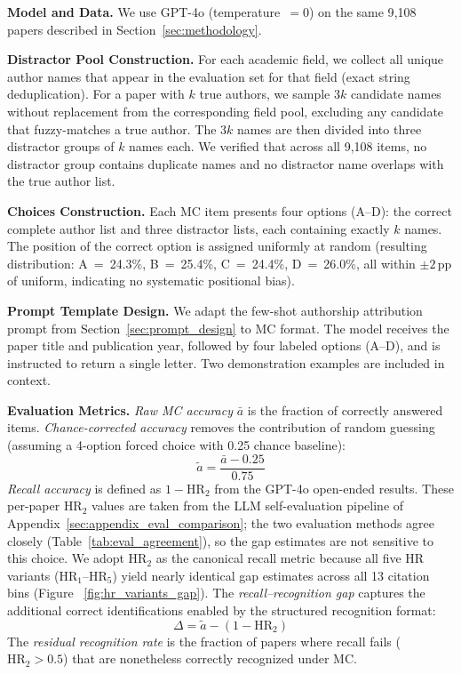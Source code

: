 \documentclass[11pt]{article}
\begin{document}
\noindent\textbf{Model and Data.}
We use GPT-4o (temperature~$= 0$) on the same 9{,}108 papers described in Section~\ref{sec:methodology}.

\noindent\textbf{Distractor Pool Construction.}
For each academic field, we collect all unique author names that appear in the evaluation set for that field (exact string deduplication). For a paper with $k$ true authors, we sample $3k$ candidate names without replacement from the corresponding field pool, excluding any candidate that fuzzy-matches a true author. The $3k$ names are then divided into three distractor groups of $k$ names each. We verified that across all 9{,}108 items, no distractor group contains duplicate names and no distractor name overlaps with the true author list.

\noindent\textbf{Choices Construction.}
Each MC item presents four options (A--D): the correct complete author list and three distractor lists, each containing exactly $k$ names. The position of the correct option is assigned uniformly at random (resulting distribution: A~=~24.3\%, B~=~25.4\%, C~=~24.4\%, D~=~26.0\%, all within $\pm 2$\,pp of uniform, indicating no systematic positional bias).

\noindent\textbf{Prompt Template Design.}
We adapt the few-shot authorship attribution prompt from Section~\ref{sec:prompt_design} to MC format. The model receives the paper title and publication year, followed by four labeled options (A--D), and is instructed to return a single letter. Two demonstration examples are included in context.

\noindent\textbf{Evaluation Metrics.}
\textit{Raw MC accuracy} $\bar{a}$ is the fraction of correctly answered items. \textit{Chance-corrected accuracy} removes the contribution of random guessing (assuming a 4-option forced choice with 0.25 chance baseline):
\begin{equation}
    \tilde{a} = \frac{\bar{a} - 0.25}{0.75}
    \label{eqn:chance_corrected}
\end{equation}
\textit{Recall accuracy} is defined as $1 - \text{HR}_2$ from the GPT-4o open-ended results. These per-paper $\text{HR}_2$ values are taken from the LLM self-evaluation pipeline of Appendix~\ref{sec:appendix_eval_comparison}; the two evaluation methods agree closely (Table~\ref{tab:eval_agreement}), so the gap estimates are not sensitive to this choice. We adopt $\text{HR}_2$ as the canonical recall metric because all five HR variants ($\text{HR}_1$--$\text{HR}_5$) yield nearly identical gap estimates across all 13 citation bins (Figure~
\ref{fig:hr_variants_gap}). The \textit{recall--recognition gap} captures the additional correct identifications enabled by the structured recognition format:
\begin{equation}
    \Delta = \tilde{a} - (1 - \text{HR}_2)
    \label{eqn:recall_recog_gap}
\end{equation}
The \textit{residual recognition rate} is the fraction of papers where recall fails ($\text{HR}_2 > 0.5$) that are nonetheless correctly recognized under MC.
\end{document}
